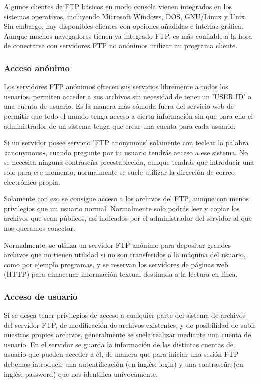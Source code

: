 \documentclass[a4paper, 12pt]{article}
\begin{document}
Algunos clientes de FTP básicos en modo consola vienen integrados en los sistemas operativos, incluyendo Microsoft Windows, DOS, GNU/Linux y Unix. Sin embargo, hay disponibles clientes con opciones añadidas e interfaz gráfica. Aunque muchos navegadores tienen ya integrado FTP, es más confiable a la hora de conectarse con servidores FTP no anónimos utilizar un programa cliente.

\subsubsection{Acceso anónimo}

Los servidores FTP anónimos ofrecen sus servicios libremente a todos los usuarios, permiten acceder a sus archivos sin necesidad de tener un 'USER ID' o una cuenta de usuario. Es la manera más cómoda fuera del servicio web de permitir que todo el mundo tenga acceso a cierta información sin que para ello el administrador de un sistema tenga que crear una cuenta para cada usuario.

Si un servidor posee servicio 'FTP anonymous' solamente con teclear la palabra «anonymous», cuando pregunte por tu usuario tendrás acceso a ese sistema. No se necesita ninguna contraseña preestablecida, aunque tendrás que introducir una solo para ese momento, normalmente se suele utilizar la dirección de correo electrónico propia.

Solamente con eso se consigue acceso a los archivos del FTP, aunque con menos privilegios que un usuario normal. Normalmente solo podrás leer y copiar los archivos que sean públicos, así indicados por el administrador del servidor al que nos queramos conectar.

Normalmente, se utiliza un servidor FTP anónimo para depositar grandes archivos que no tienen utilidad si no son transferidos a la máquina del usuario, como por ejemplo programas, y se reservan los servidores de páginas web (HTTP) para almacenar información textual destinada a la lectura en línea.

\subsubsection{Acceso de usuario}
Si se desea tener privilegios de acceso a cualquier parte del sistema de archivos del servidor FTP, de modificación de archivos existentes, y de posibilidad de subir nuestros propios archivos, generalmente se suele realizar mediante una cuenta de usuario. En el servidor se guarda la información de las distintas cuentas de usuario que pueden acceder a él, de manera que para iniciar una sesión FTP debemos introducir una autentificación (en inglés: login) y una contraseña (en inglés: password) que nos identifica unívocamente.
\end{document}
